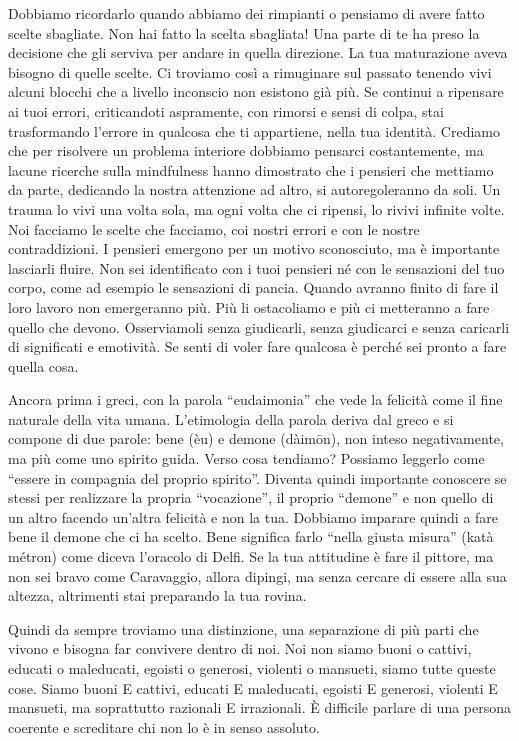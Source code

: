 \documentclass[12pt]{book} %
\begin{document}
Dobbiamo ricordarlo quando abbiamo dei rimpianti o pensiamo di avere fatto scelte sbagliate. Non hai fatto la scelta
sbagliata! Una parte di te ha preso la decisione che gli serviva per andare in quella direzione. La tua maturazione
aveva bisogno di quelle scelte. Ci troviamo così a rimuginare sul passato tenendo vivi alcuni blocchi che a livello
inconscio non esistono già più. Se continui a ripensare ai tuoi errori, criticandoti aspramente, con rimorsi e sensi di
colpa, stai trasformando l'errore in qualcosa che ti appartiene, nella tua identità.
Crediamo che per risolvere un problema interiore dobbiamo pensarci costantemente, ma lacune ricerche sulla mindfulness hanno dimostrato che i pensieri che mettiamo da parte, dedicando la nostra attenzione ad altro, si autoregoleranno da soli.
Un trauma lo vivi una volta sola, ma ogni volta che ci ripensi, lo rivivi infinite volte. Noi facciamo le scelte che facciamo, coi
nostri errori e con le nostre contraddizioni. I pensieri emergono per un motivo sconosciuto, ma è importante lasciarli
fluire. Non sei identificato con i tuoi pensieri né con le sensazioni del tuo corpo, come ad esempio le sensazioni di
pancia. Quando avranno finito di fare il loro lavoro non emergeranno più. Più li ostacoliamo e più ci metteranno a fare
quello che devono. Osserviamoli senza giudicarli, senza giudicarci e senza caricarli di significati e emotività. 
Se senti di voler fare qualcosa è perché sei pronto a fare quella cosa.

Ancora prima i greci, con la parola “eudaimonia” che vede la felicità come il fine naturale della vita umana.
L'etimologia della parola deriva dal greco e si compone di due parole: bene (èu) e demone
(dàimōn), non inteso negativamente, ma più come uno spirito guida. Verso cosa tendiamo? Possiamo leggerlo come “essere
in compagnia del proprio spirito”. Diventa quindi importante conoscere se stessi per realizzare la propria “vocazione”,
il proprio “demone” e non quello di un altro facendo un'altra felicità e non la tua. Dobbiamo
imparare quindi a fare bene il demone che ci ha scelto. Bene significa farlo “nella giusta misura” (katà métron) come
diceva l'oracolo di Delfi. Se la tua attitudine è fare il pittore, ma non sei bravo come
Caravaggio, allora dipingi, ma senza cercare di essere alla sua altezza, altrimenti stai preparando la tua rovina.

Quindi da sempre troviamo una distinzione, una separazione di più parti che vivono e bisogna far convivere dentro di
noi. Noi non siamo buoni o cattivi, educati o maleducati, egoisti o generosi, violenti o mansueti, siamo tutte queste
cose. Siamo buoni E cattivi, educati E maleducati, egoisti E generosi, violenti E mansueti, ma soprattutto razionali E
irrazionali. È difficile parlare di una persona coerente e screditare chi non lo è in senso assoluto.
\end{document}
